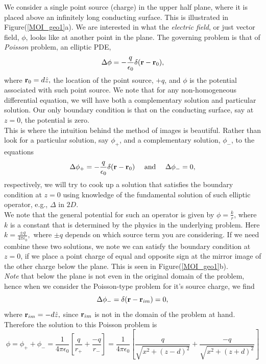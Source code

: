 We consider a single point source (charge) in the upper half plane, where it is placed above an infinitely long conducting surface. This is illustrated in Figure(\ref{MOI_geo1}a). We are interested in what the \emph{electric field}, or just vector field, $\phi$, looks like at another point in the plane. The governing problem is that of \emph{Poisson} problem, an elliptic PDE, 
$$\Delta \phi = -\frac{q}{\epsilon_0} \delta({\bf{r}} - {\bf{r}}_0),$$ where ${\bf{r}}_0 = d \hat{z},$ the location of the point source, $+q$, and $\phi$ is the potential associated with such point source. We note that for any non-homogeneous differential equation, we will have both a complementary solution and particular solution. Our only boundary condition is that on the conducting surface, say at $z=0$, the potential is zero. \\

This is where the intuition behind the method of images is beautiful. Rather than look for a particular solution, say $\phi_+$, and a complementary solution, $\phi_{-}$, to the equations $$\Delta \phi_+ = -\frac{q}{\epsilon_0} \delta({\bf{r}}-{\bf{r}}_0) \  \ \  \mbox{ and } \ \ \ \Delta \phi_{-}= 0,$$ respectively, we will try to cook up a solution that satisfies the boundary condition at $z=0$ using knowledge of the fundamental solution of such elliptic operator, e.g., $\Delta$ in $2D$.\\

We note that the general potential for such an operator is given by $\phi = \frac{k}{r}$, where $k$ is a constant that is determined by the physics in the underlying problem. Here $k=\frac{\pm q}{4\pi\epsilon_0},$ where $\pm q$ depends on which source term you are considering. If we need combine these two solutions, we note we can satisfy the boundary condition at $z=0$, if we place a point charge of equal and opposite sign at the mirror image of the other charge below the plane. This is seen in Figure(\ref{MOI_geo1}b).\\

\emph{Note} that below the plane is not even in the original domain of the problem, hence when we consider the Poisson-type problem for it's source charge, we find $$\Delta \phi_{-} = \delta( {\bf{r}}-{\bf{r}}_{im}) = 0,$$ where ${\bf{r}}_{im} = -d \hat{z},$ since ${\bf{r}}_{im}$ is not in the domain of the problem at hand.\\

Therefore the solution to this Poisson problem is $$\phi = \phi_{+} + \phi_{-} = \frac{1}{4\pi\epsilon_0} \left[  \frac{q}{r_+} + \frac{-q}{r_{-}}  \right] =\frac{1}{4\pi\epsilon_0} \left[ \frac{q}{\sqrt{x^2 + (z-d)^2 }} + \frac{-q}{\sqrt{x^2 + (z+d)^2}}  \right] $$


